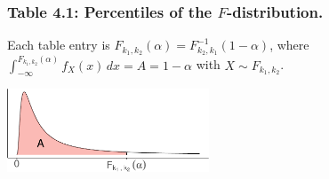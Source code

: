 \documentclass[
]{article}
\begin{document}
\newpage

\hypertarget{table-4.1-percentiles-of-the-f-distribution.}{%
\subsubsection{\texorpdfstring{Table 4.1: Percentiles of the
\(F\)-distribution.}{Table 4.1: Percentiles of the F-distribution.}}\label{table-4.1-percentiles-of-the-f-distribution.}}

Each table entry is
\(F_{k_1,k_2}(\alpha) = F_{k_2,k_1}^{-1}(1-\alpha)\), where
\(\int_{-\infty}^{F_{k_1,k_2}(\alpha)}f_X(x) \, dx = A = 1-\alpha\) with
\(X\sim F_{k_1,k_2}\).

\begin{center}\includegraphics[width=6cm]{figure/unnamed-chunk-5-1} \end{center}
\end{document}
